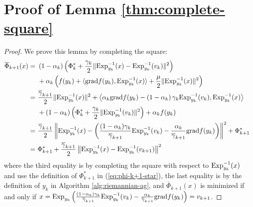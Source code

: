 \section{Proof of Lemma \ref{thm:complete-square}} \label{prf:complete-square}
\begin{proof}
	We prove this lemma by completing the square:
	\begin{align*}
	\overline{\Phi}_{k+1}(x) = &~\left(1 - \alpha_k\right)\left(\Phi_{k}^* + \frac{\gamma_k}{2}\|\mathrm{Exp}_{y_k}^{-1}(x) - \mathrm{Exp}_{y_k}^{-1}(v_k)\|^2\right) \\
	&~ + \alpha_k \left(f(y_k) + \langle \mathrm{grad} f(y_k), \mathrm{Exp}_{y_k}^{-1}(x)\rangle + \frac{\mu}{2}\|\mathrm{Exp}_{y_k}^{-1}(x)\|^2\right) \\
	= &~ \frac{\overline{\gamma}_{k+1}}{2}\|\mathrm{Exp}_{y_k}^{-1}(x)\|^2 + \left\langle \alpha_k\mathrm{grad} f(y_k) - \left(1-\alpha_k \right)\gamma_k \mathrm{Exp}_{y_k}^{-1}(v_k), \mathrm{Exp}_{y_k}^{-1}(x)\right\rangle  \\
	&~ + \left(1 - \alpha_k\right) \left(\Phi_k^* + \frac{\gamma_k}{2}\|\mathrm{Exp}_{y_k}^{-1}(v_k)\|^2 \right) + \alpha_k f(y_k) \\
	= &~ \frac{\overline{\gamma}_{k+1}}{2}\left\|\mathrm{Exp}_{y_k}^{-1}(x) - \left(\frac{(1-\alpha_k)\gamma_k}{\overline{\gamma}_{k+1}} \mathrm{Exp}_{y_k}^{-1}(v_k) - \frac{\alpha_k}{\overline{\gamma}_{k+1}} \mathrm{grad} f(y_k) \right) \right\|^2 + \Phi_{k+1}^* \\
	= &~ \Phi_{k+1}^* +  \frac{\overline{\gamma}_{k+1}}{2}\left\|\mathrm{Exp}_{y_k}^{-1}(x) - \mathrm{Exp}_{y_k}^{-1}(v_{k+1}) \right\|^2
	\end{align*}
	where the third equality is by completing the square with respect to $\mathrm{Exp}_{y_k}^{-1}(x)$ and use the definition of $\Phi_{k+1}^*$ in (\ref{eq:phi-k+1-star}), the last equality is by the definition of $y_k$ in Algorithm \ref{alg:riemannian-ag}, and $\overline{\Phi}_{k+1}(x)$ is minimized if and only if $x= \mathrm{Exp}_{y_k}\left(\frac{(1-\alpha_k)\gamma_k}{\overline{\gamma}_{k+1}} \mathrm{Exp}_{y_k}^{-1}(v_k) - \frac{\alpha_k}{\overline{\gamma}_{k+1}} \mathrm{grad} f(y_k)\right) = v_{k+1}$.
\end{proof}

